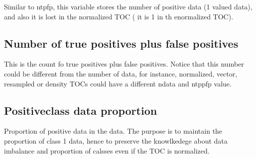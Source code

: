 \documentclass[letterpaper,10pt,english]{sphinxmanual}
\begin{document}
\begin{fulllineitems}
\label{\detokenize{usage:ootoc.TOC.npos}}
\pysigstartsignatures
{}
\pysigstopsignatures
\sphinxAtStartPar
Similar to ntpfp, this variable stores the number of positive data (1 valued data), and also it is lost in the normalized TOC ( it is 1 in th enormalized TOC).

\end{fulllineitems}



\subsection{Number of true positives plus false positives}
\label{\detokenize{usage:number-of-true-positives-plus-false-positives}}

\begin{fulllineitems}
\label{\detokenize{usage:ootoc.TOC.ntppfp}}
\pysigstartsignatures
{}
\pysigstopsignatures
\sphinxAtStartPar
This is the count fo true positives plus false positives. Notice that this number could be different from the number of data, for instance, normalized, vector, resampled or density TOCs could have a different ndata and ntppfp value.

\end{fulllineitems}



\subsection{Positive\sphinxhyphen{}class data proportion}
\label{\detokenize{usage:positive-class-data-proportion}}

\begin{fulllineitems}
\label{\detokenize{usage:ootoc.TOC.PDataProp}}
\pysigstartsignatures
{}
\pysigstopsignatures
\sphinxAtStartPar
Proportion of positive data in the data. The purpose is to maintain the proportion of class 1 data, hence to preserve the knowlkedege about data imbalance and proportion of calsses even if the TOC is normalized.

\end{fulllineitems}
\end{document}

